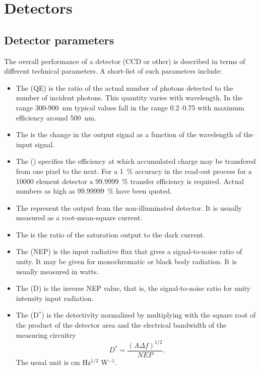 \chapter{Detectors}

\section{Detector parameters}

The overall performance of a detector (CCD or other) is described in terms of
different technical parameters. A short-list of such parameters
include:

\begin{itemize}
	\item The {} (QE) is the ratio of the actual
  number of photons detected to the number of incident photons. This
  quantity varies with wavelength. In the range 300-900~nm typical
  values fall in the range 0.2--0.75 with maximum efficiency around 
  500~nm.  
	\item The {} is the change in the output
  signal as a function of the wavelength of the input signal.
\item The {} () specifies the 
  efficiency at which accumulated charge may be transfered from one 
  pixel to the next. For a 1~\% accuracy in the read-out process 
  for a 10000 element detector a 99.9999~\% transfer efficiency is
  required. Actual numbers as high as 99.99999~\% have been quoted.
\item The {} represent the output from the
  non-illuminated detector. It is usually measured as a
  root-mean-square current.  
\item The {} is the ratio of the saturation output
  to the dark current.  
\item The {} (NEP) is the input radiative 
  flux that gives
  a signal-to-noise ratio of unity. It may be given for monochromatic
  or black body radiation. It is usually measured in watts.  
\item The  {} (D) is the inverse NEP value, that is, the
  signal-to-noise ratio for unity intensity input radiation.  
\item  The {} (D$^*$) is the detectivity
  normalized by multiplying with the square root of the product of the
  detector area and the electrical bandwidth of the measuring
  circuitry 
  \begin{equation} 
    D^* = \frac{(A \Delta f)^{1/2}}{NEP}.
    \label{CCD.Dstar}
  \end{equation}
  The usual unit is cm Hz$^{1/2}$ W$^{-1}$.
\end{itemize}

